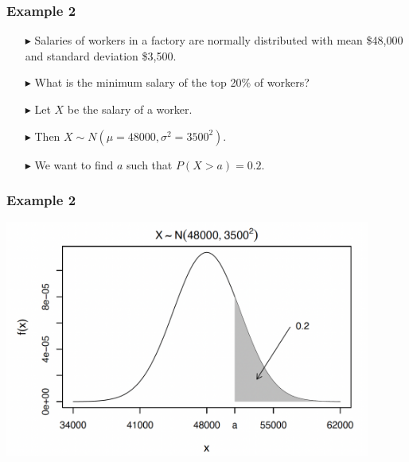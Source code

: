 \documentclass[12pt]{beamer}
\begin{document}
\begin{frame}
	\frametitle{Example 2}
	
	\begin{itemize}
		\item[\color{blue}$\blacktriangleright$] Salaries of workers in a factory are normally 
		distributed with mean \$48,000 and standard 
		deviation \$3,500.
		
		\item[\color{blue}$\blacktriangleright$] What is the minimum salary of the top 20\% of 
		workers?
		
		\item[\color{blue}$\blacktriangleright$] Let $X$ be the salary of a worker.
		
		\item[\color{blue}$\blacktriangleright$] Then $X \sim N(\mu = 48000, \sigma^2 = 3500^2)$.
		
		\item[\color{blue}$\blacktriangleright$] We want to find $a$ such that $P(X > a) = 0.2$.
	\end{itemize}
	
\end{frame}
	\begin{frame}
	\frametitle{Example 2}
	\centering
	\includegraphics[width=12cm]{example2.png}
\end{frame}
\end{document}
